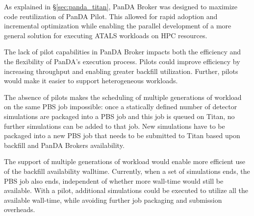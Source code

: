 
As explained in \S\ref{sec:panda_titan}, PanDA Broker was designed to
maximize code reutilization of PanDA Pilot. This allowed for rapid adoption
and incremental optimization while enabling the parallel development of a
more general solution for executing ATALS workloads on HPC resources.

The lack of pilot capabilities in PanDA Broker impacts both the efficiency
and the flexibility of PanDA's execution process. Pilots could improve
efficiency by increasing throughput and enabling greater backfill
utilization. Further, pilots would make it easier to support heterogeneous
workloads.

The absence of pilots makes the scheduling of multiple generations of
workload on the same PBS job impossible: once a statically defined number of
detector simulations are packaged into a PBS job and this job is queued on
Titan, no further simulations can be added to that job. New simulations have
to be packaged into a new PBS job that needs to be submitted to Titan based
upon backfill and PanDA Brokers availability.

The support of multiple generations of workload would enable more efficient
use of the backfill availability walltime. Currently, when a set of
simulations ends, the PBS job also ends, independent of whether more
wall-time would still be available. With a pilot, additional simulations
could be executed to utilize all the available wall-time, while avoiding
further job packaging and submission overheads.

